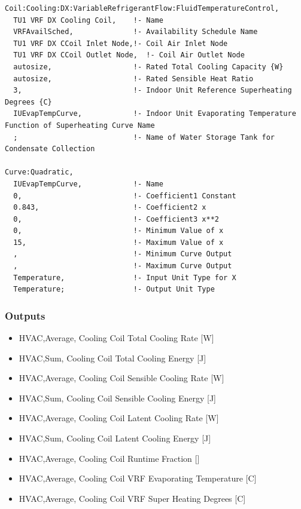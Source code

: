 \begin{lstlisting}
Coil:Cooling:DX:VariableRefrigerantFlow:FluidTemperatureControl,
  TU1 VRF DX Cooling Coil,    !- Name
  VRFAvailSched,              !- Availability Schedule Name
  TU1 VRF DX CCoil Inlet Node,!- Coil Air Inlet Node
  TU1 VRF DX CCoil Outlet Node,  !- Coil Air Outlet Node
  autosize,                   !- Rated Total Cooling Capacity {W}
  autosize,                   !- Rated Sensible Heat Ratio
  3,                          !- Indoor Unit Reference Superheating Degrees {C}
  IUEvapTempCurve,            !- Indoor Unit Evaporating Temperature Function of Superheating Curve Name
  ;                           !- Name of Water Storage Tank for Condensate Collection

Curve:Quadratic,
  IUEvapTempCurve,            !- Name
  0,                          !- Coefficient1 Constant
  0.843,                      !- Coefficient2 x
  0,                          !- Coefficient3 x**2
  0,                          !- Minimum Value of x
  15,                         !- Maximum Value of x
  ,                           !- Minimum Curve Output
  ,                           !- Maximum Curve Output
  Temperature,                !- Input Unit Type for X
  Temperature;                !- Output Unit Type
\end{lstlisting}

\subsubsection{Outputs}\label{outputs-7-003}

\begin{itemize}
\item
  HVAC,Average, Cooling Coil Total Cooling Rate {[}W{]}
\item
  HVAC,Sum, Cooling Coil Total Cooling Energy {[}J{]}
\item
  HVAC,Average, Cooling Coil Sensible Cooling Rate {[}W{]}
\item
  HVAC,Sum, Cooling Coil Sensible Cooling Energy {[}J{]}
\item
  HVAC,Average, Cooling Coil Latent Cooling Rate {[}W{]}
\item
  HVAC,Sum, Cooling Coil Latent Cooling Energy {[}J{]}
\item
  HVAC,Average, Cooling Coil Runtime Fraction {[]}
\item
  HVAC,Average, Cooling Coil VRF Evaporating Temperature {[}C{]}
\item
  HVAC,Average, Cooling Coil VRF Super Heating Degrees {[}C{]}
\end{itemize}

